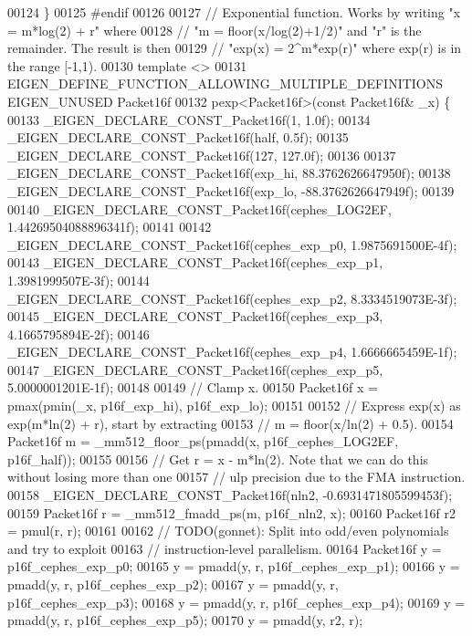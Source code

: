\begin{DoxyCode}
00124 \}
00125 \textcolor{preprocessor}{#endif}
00126 
00127 \textcolor{comment}{// Exponential function. Works by writing "x = m*log(2) + r" where}
00128 \textcolor{comment}{// "m = floor(x/log(2)+1/2)" and "r" is the remainder. The result is then}
00129 \textcolor{comment}{// "exp(x) = 2^m*exp(r)" where exp(r) is in the range [-1,1).}
00130 \textcolor{keyword}{template} <>
00131 EIGEN\_DEFINE\_FUNCTION\_ALLOWING\_MULTIPLE\_DEFINITIONS EIGEN\_UNUSED Packet16f
00132 pexp<Packet16f>(\textcolor{keyword}{const} Packet16f& \_x) \{
00133   \_EIGEN\_DECLARE\_CONST\_Packet16f(1, 1.0f);
00134   \_EIGEN\_DECLARE\_CONST\_Packet16f(half, 0.5f);
00135   \_EIGEN\_DECLARE\_CONST\_Packet16f(127, 127.0f);
00136 
00137   \_EIGEN\_DECLARE\_CONST\_Packet16f(exp\_hi, 88.3762626647950f);
00138   \_EIGEN\_DECLARE\_CONST\_Packet16f(exp\_lo, -88.3762626647949f);
00139 
00140   \_EIGEN\_DECLARE\_CONST\_Packet16f(cephes\_LOG2EF, 1.44269504088896341f);
00141 
00142   \_EIGEN\_DECLARE\_CONST\_Packet16f(cephes\_exp\_p0, 1.9875691500E-4f);
00143   \_EIGEN\_DECLARE\_CONST\_Packet16f(cephes\_exp\_p1, 1.3981999507E-3f);
00144   \_EIGEN\_DECLARE\_CONST\_Packet16f(cephes\_exp\_p2, 8.3334519073E-3f);
00145   \_EIGEN\_DECLARE\_CONST\_Packet16f(cephes\_exp\_p3, 4.1665795894E-2f);
00146   \_EIGEN\_DECLARE\_CONST\_Packet16f(cephes\_exp\_p4, 1.6666665459E-1f);
00147   \_EIGEN\_DECLARE\_CONST\_Packet16f(cephes\_exp\_p5, 5.0000001201E-1f);
00148 
00149   \textcolor{comment}{// Clamp x.}
00150   Packet16f x = pmax(pmin(\_x, p16f\_exp\_hi), p16f\_exp\_lo);
00151 
00152   \textcolor{comment}{// Express exp(x) as exp(m*ln(2) + r), start by extracting}
00153   \textcolor{comment}{// m = floor(x/ln(2) + 0.5).}
00154   Packet16f m = \_mm512\_floor\_ps(pmadd(x, p16f\_cephes\_LOG2EF, p16f\_half));
00155 
00156   \textcolor{comment}{// Get r = x - m*ln(2). Note that we can do this without losing more than one}
00157   \textcolor{comment}{// ulp precision due to the FMA instruction.}
00158   \_EIGEN\_DECLARE\_CONST\_Packet16f(nln2, -0.6931471805599453f);
00159   Packet16f r = \_mm512\_fmadd\_ps(m, p16f\_nln2, x);
00160   Packet16f r2 = pmul(r, r);
00161 
00162   \textcolor{comment}{// TODO(gonnet): Split into odd/even polynomials and try to exploit}
00163   \textcolor{comment}{//               instruction-level parallelism.}
00164   Packet16f y = p16f\_cephes\_exp\_p0;
00165   y = pmadd(y, r, p16f\_cephes\_exp\_p1);
00166   y = pmadd(y, r, p16f\_cephes\_exp\_p2);
00167   y = pmadd(y, r, p16f\_cephes\_exp\_p3);
00168   y = pmadd(y, r, p16f\_cephes\_exp\_p4);
00169   y = pmadd(y, r, p16f\_cephes\_exp\_p5);
00170   y = pmadd(y, r2, r);

\end{DoxyCode}
